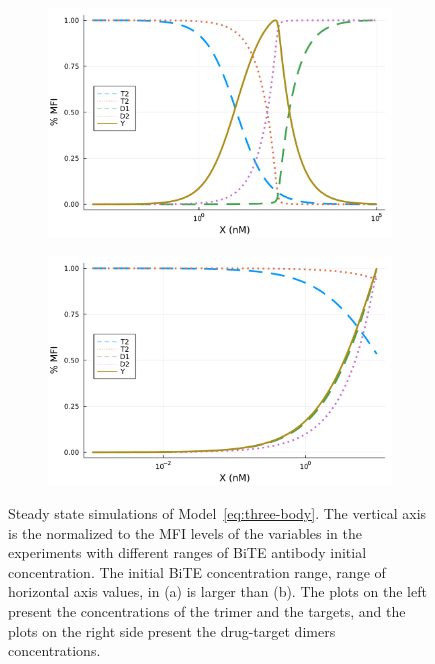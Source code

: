 \begin{figure}
	\centering
	\begin{subfigure}[b]{0.49\textwidth}
		\centering
		\includegraphics[width=1\textwidth]{fig/Dish_1.pdf}
		\caption{}
		\label{fig:3}
	\end{subfigure} 
	\begin{subfigure}[b]{0.49\textwidth}
		\centering
		\includegraphics[width=1\textwidth]{fig/Dish_2.pdf}
		\caption{}
		\label{fig:4}
	\end{subfigure}
	\caption[Steady state simulations]{Steady state simulations of Model~\eqref{eq:three-body}. The vertical axis is the normalized to the \ac{MFI} levels of the variables in the experiments with different ranges of \ac{BiTE} antibody initial concentration. The initial \ac{BiTE} concentration range, range of horizontal axis values, in (a) is larger than (b). The plots on the left present the concentrations of the trimer and the targets, and the plots on the right side present the drug-target dimers concentrations.}
	\label{fig:ss}
\end{figure}

